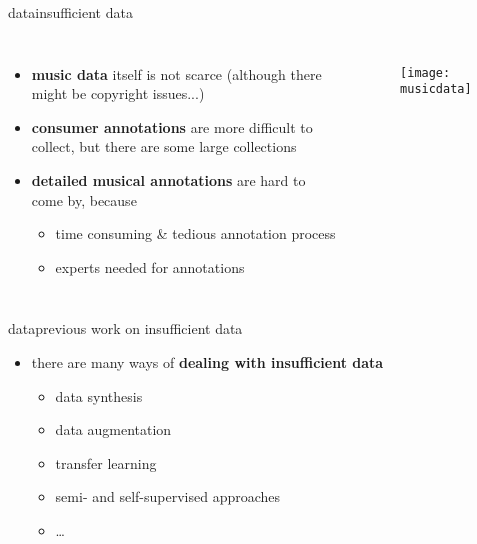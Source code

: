 \begin{frame}{data}{insufficient data}
    
    \begin{columns}
    \begin{itemize}
        \item<1->   \textbf{music data} itself is not scarce (although there might be copyright issues...)
        \bigskip
        \item<2->   \textbf{consumer annotations} are more difficult to collect, but there are some large collections
        \bigskip
        \item<3->   \textbf{detailed musical annotations} are hard to come by, because
        \begin{itemize}
            \item   time consuming \& tedious annotation process
            \item   experts needed for annotations
        \end{itemize}
    \end{itemize}
    \begin{figure}
        \texttt{[image: musicdata]}
    \end{figure}
    \end{columns}
\end{frame}

\begin{frame}{data}{previous work on insufficient data}
	    \begin{itemize}
        \item   there are many ways of \textbf{dealing with insufficient data}
            \begin{itemize}
                \item   data synthesis
                \smallskip
								\item   data augmentation %
                \smallskip
								\item<2->   transfer learning {\cite{gururani_attention_2019}}
                \smallskip
								\item<3->   semi- and self-supervised approaches {\cite{wu_automatic_2017}\cite{gururani_semi-supervised_2021}} 
                \smallskip
								\item<3->   \ldots
            \end{itemize}
		\end{itemize}
\end{frame}
